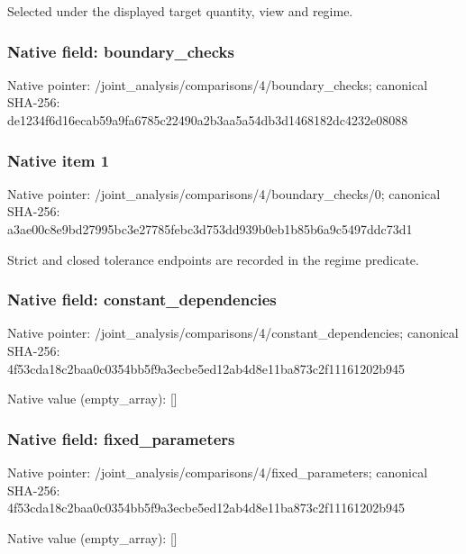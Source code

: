 \documentclass[10pt,a4paper]{article}
\begin{document}
Selected under the displayed target quantity, view and regime.


\subsubsection{Native field: boundary\_checks}


Native pointer: /joint\_analysis/comparis\allowbreak{}ons/4/boundary\_checks; canonical SHA-256: de1234f6d16ecab59a9fa678\allowbreak{}5c22490a2b3aa5a54db3d146\allowbreak{}8182dc4232e08088



\subsubsection{Native item 1}


Native pointer: /joint\_analysis/comparis\allowbreak{}ons/4/boundary\_checks/0; canonical SHA-256: a3ae00c8e9bd27995bc3e277\allowbreak{}85febc3d753dd939b0eb1b85\allowbreak{}b6a9c5497ddc73d1


Strict and closed tolerance endpoints are recorded in the regime predicate.


\subsubsection{Native field: constant\_dependencies}


Native pointer: /joint\_analysis/comparis\allowbreak{}ons/4/constant\_dependenc\allowbreak{}ies; canonical SHA-256: 4f53cda18c2baa0c0354bb5f\allowbreak{}9a3ecbe5ed12ab4d8e11ba87\allowbreak{}3c2f11161202b945



Native value (empty\_array): []



\subsubsection{Native field: fixed\_parameters}


Native pointer: /joint\_analysis/comparis\allowbreak{}ons/4/fixed\_parameters; canonical SHA-256: 4f53cda18c2baa0c0354bb5f\allowbreak{}9a3ecbe5ed12ab4d8e11ba87\allowbreak{}3c2f11161202b945



Native value (empty\_array): []
\end{document}
